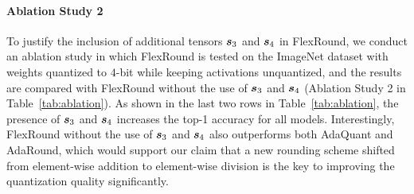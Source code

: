 \documentclass{article}
\theoremstyle{plain}
\theoremstyle{definition}
\theoremstyle{remark}
\begin{document}

\paragraph{Ablation Study 2} To justify the inclusion of additional tensors ${\bm{s}}_3$ and ${\bm{s}}_4$ in FlexRound,
we conduct an ablation study in which 
FlexRound is tested on the ImageNet dataset with weights quantized to $4$-bit while keeping activations unquantized, and the results are compared with FlexRound without the use of ${\bm{s}}_3$ and ${\bm{s}}_4$ (Ablation Study 2 in Table~\ref{tab:ablation}). As shown in the last two rows in Table~\ref{tab:ablation}, the presence of ${\bm{s}}_3$ and ${\bm{s}}_4$ increases the top-1 accuracy for all models. Interestingly, FlexRound without the use of ${\bm{s}}_3$ and ${\bm{s}}_4$ also outperforms both AdaQuant and AdaRound, which would support our claim that a new rounding scheme shifted from element-wise addition to element-wise division is the key to improving the quantization quality significantly. %

\end{document}
